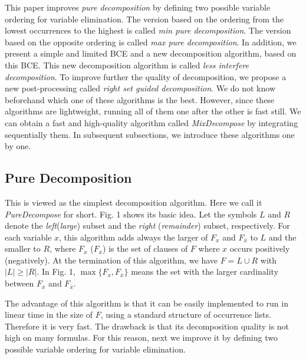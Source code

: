 \documentclass{llncs}
\begin{document}
This paper improves \emph{pure decomposition} by defining two
possible variable ordering for variable elimination. The version
based on the ordering from the lowest occurrences to the highest is
called \emph{min pure decomposition}. The version based on the
opposite ordering is called \emph{max pure decomposition}. In
addition, we present a simple and limited BCE and a new
decomposition algorithm, based on this BCE. This new decomposition
algorithm is called \emph{less interfere decomposition}. To improve
further the quality of decomposition, we propose a new
post-processing called \emph{right set guided decomposition}. We do
not know beforehand which one of these algorithms is the best.
However, since these algorithms are lightweight, running all of them
one after the other is fast still. We can obtain a fast and
high-quality algorithm called \emph{MixDecompose} by integrating
sequentially them. In subsequent subsections, we introduce these
algorithms one by one.


\subsection{Pure Decomposition}

This is viewed as the simplest decomposition algorithm. Here we call
it \emph{PureDecompose} for short. Fig. 1 shows its basic idea. Let
the symbols $L$ and $R$ denote the \emph{left}(\emph{large}) subset
and the \emph{right} (\emph{remainder}) subset, respectively. For
each variable $x$, this algorithm adds always the larger of $F_x$
and $F_{\bar x}$ to $L$ and the smaller to $R$, where $F_x$
($F_{\bar x}$) is the set of clauses of $F$ where $x$ occurs
positively (negatively). At the termination of this algorithm, we
have $F = L \cup R $ with $|L| \geq |R|$. In Fig. 1, $\max\{ F_x,
F_{\bar x} \}$ means the set with the larger cardinality between
$F_x$ and $F_{\bar x}$.

   The advantage of this algorithm is that it can be easily implemented
to run in linear time in the size of $F$, using a standard structure
of occurrence lists. Therefore it is very fast. The drawback is that
its decomposition quality is not high on many formulas. For this
reason, next we improve it by defining two possible variable
ordering for variable elimination.
\end{document}
